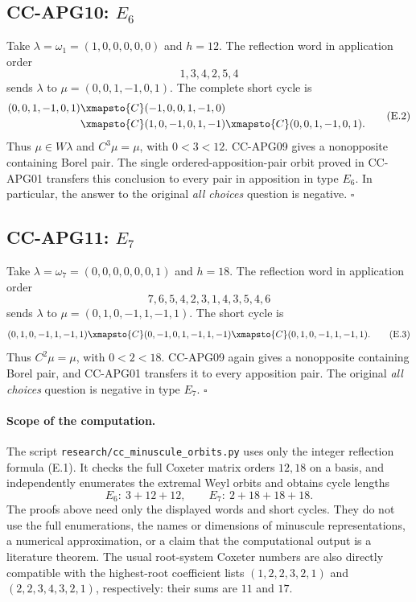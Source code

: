 \documentclass[11pt,a4paper]{article}
\theoremstyle{definition}\newtheorem{definition}[theorem]{Definition}
\theoremstyle{remark}\newtheorem{remark}[theorem]{Remark}
\begin{document}
\subsection{CC-APG10: \(E_6\)}

Take \(\lambda=\omega_1=(1,0,0,0,0,0)\) and \(h=12\).
The reflection word in application order
\[
                           1,3,4,2,5,4
\]
sends \(\lambda\) to
\(\mu=(0,0,1,-1,0,1)\).
The complete short cycle is
\[
\begin{split}
 (0,0,1,-1,0,1)
     &\xmapsto{C}(-1,0,0,1,-1,0)\\
     &\xmapsto{C}(1,0,-1,0,1,-1)
       \xmapsto{C}(0,0,1,-1,0,1).
\end{split}                                                   \tag{E.2}
\]
Thus \(\mu\in W\lambda\) and \(C^3\mu=\mu\), with \(0<3<12\).
CC-APG09 gives a nonopposite containing Borel pair.
The single ordered-apposition-pair orbit proved in CC-APG01
transfers this conclusion to every pair in apposition in type
\(E_6\). In particular, the answer to the original
\emph{all choices} question is negative. \(\square\)

\subsection{CC-APG11: \(E_7\)}

Take \(\lambda=\omega_7=(0,0,0,0,0,0,1)\) and \(h=18\).
The reflection word in application order
\[
                         7,6,5,4,2,3,1,4,3,5,4,6
\]
sends \(\lambda\) to
\(\mu=(0,1,0,-1,1,-1,1)\).
The short cycle is
\[
  (0,1,0,-1,1,-1,1)
     \xmapsto{C}(0,-1,0,1,-1,1,-1)
     \xmapsto{C}(0,1,0,-1,1,-1,1).                         \tag{E.3}
\]
Thus \(C^2\mu=\mu\), with \(0<2<18\).
CC-APG09 again gives a nonopposite containing Borel pair,
and CC-APG01 transfers it to every apposition pair.
The original \emph{all choices} question is negative in type
\(E_7\). \(\square\)

\paragraph{Scope of the computation.}
The script \texttt{research/cc\_minuscule\_orbits.py} uses only
the integer reflection formula (E.1). It checks the full Coxeter
matrix orders \(12,18\) on a basis, and independently enumerates
the extremal Weyl orbits and obtains cycle lengths
\[
                  E_6:\ 3+12+12,\qquad
                  E_7:\ 2+18+18+18.
\]
The proofs above need only the displayed words and short cycles.
They do not use the full enumerations, the names or dimensions
of minuscule representations, a numerical approximation, or a
claim that the computational output is a literature theorem.
The usual root-system Coxeter numbers are also directly compatible
with the highest-root coefficient lists
\((1,2,2,3,2,1)\) and \((2,2,3,4,3,2,1)\), respectively:
their sums are \(11\) and \(17\).
\end{document}
